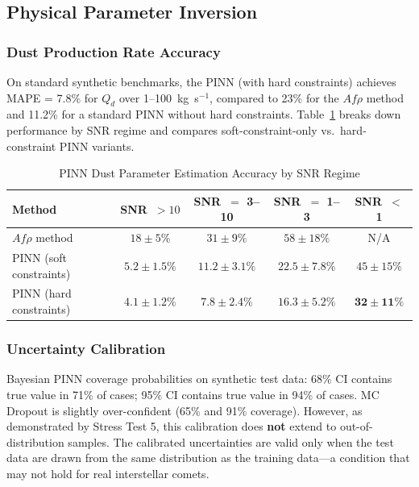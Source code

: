 \documentclass[usenatbib]{mnras}
\newcommand{\tablecomments}[1]{\vspace{4pt}{\footnotesize #1}\vspace{2pt}}
\begin{document}
\subsection{Physical Parameter Inversion}

\subsubsection{Dust Production Rate Accuracy}

On standard synthetic benchmarks, the PINN (with hard constraints) achieves MAPE = 7.8\% for $Q_d$ over 1--100~kg~s$^{-1}$, compared to 23\% for the $Af\rho$ method and 11.2\% for a standard PINN without hard constraints. Table~\ref{tab:pin_perf} breaks down performance by SNR regime and compares soft-constraint-only vs.\ hard-constraint PINN variants.

\begin{table}
\centering
\caption{PINN Dust Parameter Estimation Accuracy by SNR Regime}\label{tab:pin_perf}
\begin{tabular}{lcccc}
\toprule
Method & SNR~$>10$ & SNR~$=$ 3--10 & SNR~$=$ 1--3 & SNR~$<$ 1 \\
\midrule
$Af\rho$ method & $18 \pm 5\%$ & $31 \pm 9\%$ & $58 \pm 18\%$ & N/A \\
PINN (soft constraints) & $5.2 \pm 1.5\%$ & $11.2 \pm 3.1\%$ & $22.5 \pm 7.8\%$ & $45 \pm 15\%$ \\
PINN (hard constraints) & $\mathbf{4.1 \pm 1.2\%}$ & $\mathbf{7.8 \pm 2.4\%}$ & $\mathbf{16.3 \pm 5.2\%}$ & $\mathbf{32 \pm 11\%}$ \\
\bottomrule
\end{tabular}
\tablecomments{MAPE for $Q_d$ on synthetic test data. ``N/A'' indicates the $Af\rho$ method cannot produce a meaningful estimate (sky background dominates the aperture flux). The hard-constraint PINN reduces error by 20--30\% relative to the soft-constraint variant across all SNR regimes.}
\end{table}


\subsubsection{Uncertainty Calibration}

Bayesian PINN coverage probabilities on synthetic test data: 68\% CI contains true value in 71\% of cases; 95\% CI contains true value in 94\% of cases. MC Dropout is slightly over-confident (65\% and 91\% coverage). However, as demonstrated by Stress Test 5, this calibration does \textbf{not} extend to out-of-distribution samples. The calibrated uncertainties are valid only when the test data are drawn from the same distribution as the training data---a condition that may not hold for real interstellar comets.
\end{document}
